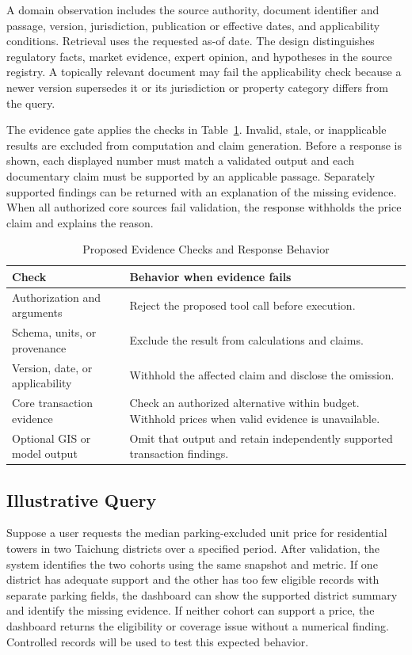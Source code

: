 A domain observation includes the source authority, document identifier and passage, version, jurisdiction, publication or effective dates, and applicability conditions. Retrieval uses the requested as-of date. The design distinguishes regulatory facts, market evidence, expert opinion, and hypotheses in the source registry. A topically relevant document may fail the applicability check because a newer version supersedes it or its jurisdiction or property category differs from the query.

The evidence gate applies the checks in Table~\ref{tab:gate}. Invalid, stale, or inapplicable results are excluded from computation and claim generation. Before a response is shown, each displayed number must match a validated output and each documentary claim must be supported by an applicable passage. Separately supported findings can be returned with an explanation of the missing evidence. When all authorized core sources fail validation, the response withholds the price claim and explains the reason.


\begin{table}[t]
\caption{Proposed Evidence Checks and Response Behavior}
\label{tab:gate}
\centering
\small
\begin{tabularx}{\columnwidth}{@{}>{\raggedright\arraybackslash}p{}>{\raggedright\arraybackslash}X@{}}
\toprule
Check & Behavior when evidence fails \\
\midrule
Authorization and arguments & Reject the proposed tool call before execution. \\
Schema, units, or provenance & Exclude the result from calculations and claims. \\
Version, date, or applicability & Withhold the affected claim and disclose the omission. \\
Core transaction evidence & Check an authorized alternative within budget. Withhold prices when valid evidence is unavailable. \\
Optional GIS or model output & Omit that output and retain independently supported transaction findings. \\
\bottomrule
\end{tabularx}
\end{table}


\subsection{Illustrative Query}
Suppose a user requests the median parking-excluded unit price for residential towers in two Taichung districts over a specified period. After validation, the system identifies the two cohorts using the same snapshot and metric. If one district has adequate support and the other has too few eligible records with separate parking fields, the dashboard can show the supported district summary and identify the missing evidence. If neither cohort can support a price, the dashboard returns the eligibility or coverage issue without a numerical finding. Controlled records will be used to test this expected behavior.

